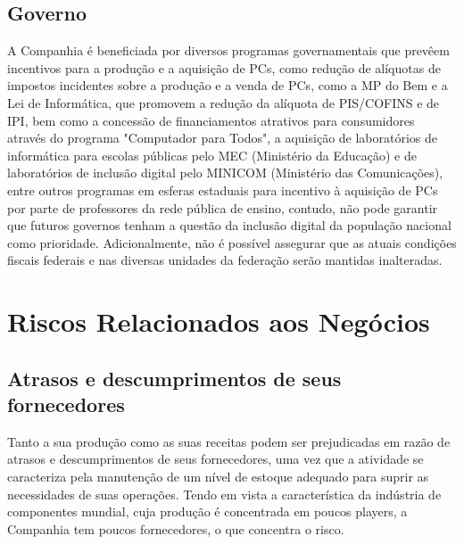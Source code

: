 \subsection{Governo} 
A Companhia é beneficiada por diversos programas governamentais que prevêem incentivos para a produção e a aquisição de PCs, como redução de alíquotas de impostos incidentes sobre a produção e a venda de PCs, como a MP do Bem e a Lei de Informática, que promovem a redução da alíquota de PIS/COFINS e de IPI, bem como a concessão de financiamentos atrativos para consumidores através do programa "Computador para Todos", a aquisição de laboratórios de informática para escolas públicas pelo MEC (Ministério da Educação) e de laboratórios de inclusão digital pelo MINICOM (Ministério das Comunicações), entre outros programas em esferas estaduais para incentivo à aquisição de PCs por parte de professores da rede pública de ensino, contudo, não pode garantir que futuros governos tenham a questão da inclusão digital da população nacional como prioridade.
Adicionalmente, não é possível assegurar que as atuais condições fiscais federais e nas diversas unidades da federação serão mantidas inalteradas.

\section{Riscos Relacionados aos Negócios}

\subsection{Atrasos e descumprimentos de seus fornecedores} 
Tanto a sua produção como as suas receitas podem ser prejudicadas em razão de atrasos e descumprimentos de seus fornecedores, uma vez que a atividade se caracteriza pela manutenção de um nível de estoque adequado para suprir as necessidades de suas operações.  Tendo em vista a característica da indústria de componentes mundial, cuja produção é concentrada em poucos players, a Companhia tem poucos fornecedores, o que concentra o risco.

